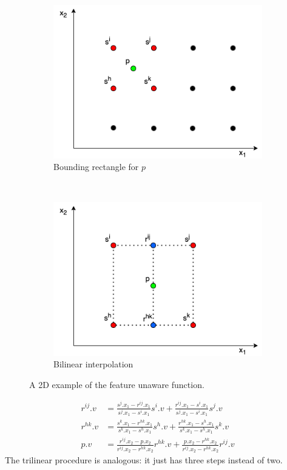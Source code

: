 \begin{figure}[t]
\centering
\begin{subfigure}[t]{.45\textwidth}
\centering
\includegraphics[scale=.4]{chapters/physics-aware/pluto/img/statistical_profiling_function.png}
\caption{Bounding rectangle for $p$}
\label{pluto-fig:statistical-profiling-function}
\end{subfigure}
~
\begin{subfigure}[t]{.45\textwidth}
\centering
\includegraphics[scale=.4]{chapters/physics-aware/pluto/img/bilinear_interpolation.png}
\caption{Bilinear interpolation}
\label{pluto-fig:bilinear-interpolation}
\end{subfigure}
\caption{A 2D example of the feature unaware function.}
\label{pluto-fig:statistical-profiling-function-explanation}
\end{figure}


 
\begin{align*}
    r^{ij}.v &= \frac{s^j.x_1-r^{ij}.x_1}{s^j.x_1-s^i.x_1} s^i.v + \frac{r^{ij}.x_1-s^i.x_1}{s^j.x_1-s^i.x_1} s^j.v\\
    r^{hk}.v &= \frac{s^k.x_1-r^{hk}.x_1}{s^k.x_1-s^h.x_1} s^h.v + \frac{r^{hk}.x_1-s^h.x_1}{s^k.x_1-s^h.x_1} s^k.v \\
    p.v &= \frac{r^{ij}.x_2-p.x_2}{r^{ij}.x_2-r^{hk}.x_2} r^{hk}.v + \frac{p.x_2-r^{hk}.x_2}{r^{ij}.x_2-r^{hk}.x_2} r^{ij}.v
\end{align*}
The trilinear procedure is analogous: it just has three steps instead of two.


